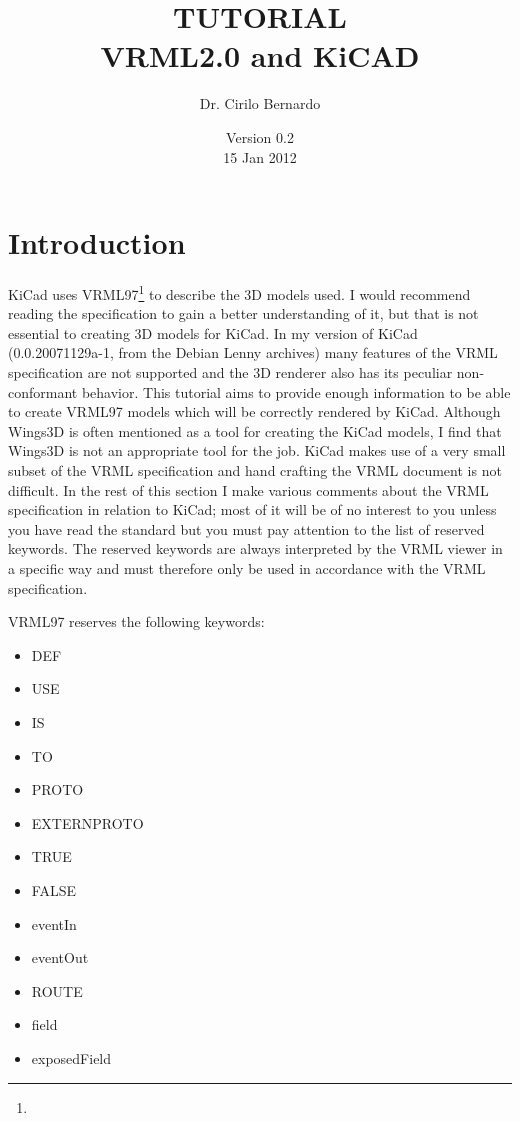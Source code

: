 \documentclass[a4paper, dvipdfm]{article}
\title{TUTORIAL\\
VRML2.0 and KiCAD}
\date{Version 0.2\\
15 Jan 2012}
\author{Dr. Cirilo Bernardo}
\makeatletter
\def\maketitle{%
  \null
  \thispagestyle{empty}%
  \vfill
  \begin{center}\leavevmode
    \normalfont
{\LARGE \@title\par}%
    \vskip 1cm
{\Large \@author\par}%
    \vskip 1cm
{\Large \@date\par}%
  \end{center}%
  \vfill
  \null
  \cleardoublepage
}
\makeatother
\begin{document}
\maketitle

%
%

\setcounter{page}{1}

\section{Introduction}
KiCad uses VRML97\footnote{}
to describe the 3D models used.
I would recommend reading the specification to gain a better understanding of it, but that is not essential to creating 3D models for KiCad.  In my
version of KiCad (0.0.20071129a-1, from the Debian Lenny archives) many features of the VRML specification are not supported and the 3D renderer also
has its peculiar non-conformant behavior.  This tutorial aims to provide enough information to be able to create VRML97 models which will be
correctly rendered by KiCad. Although Wings3D is often mentioned as a tool for creating the KiCad models, I find that Wings3D is not an appropriate
tool for the job.  KiCad makes use of a very small subset of the VRML specification and hand crafting the VRML document is not difficult.
In the rest of this section I make various comments about the VRML specification in relation to KiCad; most of it will be of no interest to
you unless you have read the standard but you must pay attention to the list of reserved keywords. The reserved keywords are always interpreted by the
VRML viewer in a specific way and must therefore only be used in accordance with the VRML specification.

VRML97 reserves the following keywords:

\begin{itemize}
\item {DEF}
\item {USE}
\item {IS}
\item {TO}
\item {PROTO}
\item {EXTERNPROTO}
\item {TRUE}
\item {FALSE}
\item {eventIn}
\item {eventOut}
\item {ROUTE}
\item {field}
\item {exposedField}
\end{itemize}
\end{document}
